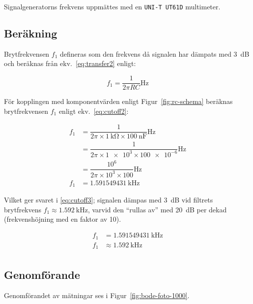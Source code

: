 Signalgeneratorns frekvens uppmättes med en \texttt{UNI-T UT61D} multimeter.


\subsection{Beräkning}
Brytfrekvensen $f_1$ defineras som den frekvens då signalen har dämpats med
\SI{3}{\dB} och beräknas från ekv.~\eqref{eq:transfer2} enligt:

\begin{equation}\label{eq:cutoff}
  f_1 = \dfrac{1}{2 \pi R C} \si{\Hz}
\end{equation}

För kopplingen med komponentvärden enligt Figur~\ref{fig:rc-schema} beräknas
brytfrekvensen $f_1$ enligt ekv.~\eqref{eq:cutoff2}:

\begin{equation}\label{eq:cutoff2}
  \begin{split}
    f_1 &= \dfrac{1}{2 \pi \times \SI{1}{\kohm} \times \SI{100}{\nano\farad}} \si{\Hz} \\
        &= \dfrac{1}{2 \pi \times \num{1e3} \times \num{100e-6}} \si{\Hz}              \\
        &= \dfrac{10^6}{2 \pi \times 10^3 \times \num{100}} \si{\Hz}                   \\
    f_1 &= \SI{1.591549431}{\kHz}
  \end{split}
\end{equation}

Vilket ger svaret i \eqref{eq:cutoff3}; signalen dämpas med \SI{3}{\dB} vid
filtrets brytfrekvens $f_1 \approx \SI{1.592}{\kHz}$, varvid den ``rullas av''
med \SI{20}{\dB} per dekad (frekvenshöjning med en faktor av 10). 

\begin{equation}\label{eq:cutoff3}
  \begin{split}
    f_1 &= \SI{1.591549431}{\kHz} \\
    f_1 &\approx \SI{1.592}{\kHz} \\
  \end{split}
\end{equation}


\subsection{Genomförande}
Genomförandet av mätningar ses i Figur~\ref{fig:bode-foto-1000}.


